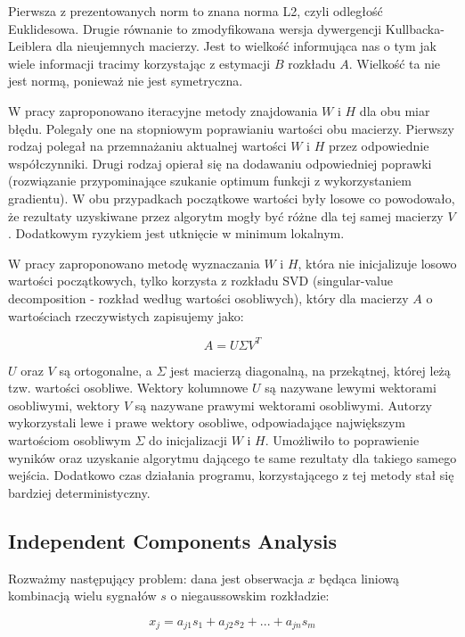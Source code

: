 \documentclass[oneside, eng]{mgr}
\begin{document}
Pierwsza z prezentowanych norm to znana norma L2, czyli odległość Euklidesowa. Drugie równanie to zmodyfikowana wersja dywergencji Kullbacka-Leiblera dla nieujemnych macierzy. Jest to wielkość informująca nas o tym jak wiele informacji tracimy korzystając z estymacji $B$ rozkładu $A$. Wielkość ta nie jest normą, ponieważ nie jest symetryczna.

W pracy \cite{NMF} zaproponowano iteracyjne metody znajdowania $W$ i $H$ dla obu miar błędu. Polegały one na stopniowym poprawianiu wartości obu macierzy. Pierwszy rodzaj polegał na przemnażaniu aktualnej wartości $W$ i $H$ przez odpowiednie współczynniki. Drugi rodzaj opierał się na dodawaniu odpowiedniej poprawki (rozwiązanie przypominające szukanie optimum funkcji z wykorzystaniem gradientu). W obu przypadkach początkowe wartości były losowe co powodowało, że rezultaty uzyskiwane przez algorytm mogły być różne dla tej samej macierzy $V$. Dodatkowym ryzykiem jest utknięcie w minimum lokalnym.

W pracy \cite{NMF_SVD} zaproponowano metodę wyznaczania $W$ i $H$, która nie inicjalizuje losowo wartości początkowych, tylko korzysta z rozkładu SVD (singular-value decomposition - rozkład według wartości osobliwych), który dla macierzy $A$ o wartościach rzeczywistych zapisujemy jako:

\begin{equation}
	A = U \Sigma V^T
\end{equation}

$U$ oraz $V$ są ortogonalne, a $\Sigma$ jest macierzą diagonalną, na przekątnej, której leżą tzw. wartości osobliwe. Wektory kolumnowe $U$ są nazywane lewymi wektorami osobliwymi, wektory $V$ są nazywane prawymi wektorami osobliwymi. Autorzy \cite{NMF_SVD} wykorzystali lewe i prawe wektory osobliwe, odpowiadające największym wartościom osobliwym $\Sigma$ do inicjalizacji $W$ i $H$. Umożliwiło to poprawienie wyników oraz uzyskanie algorytmu dającego te same rezultaty dla takiego samego wejścia. Dodatkowo czas działania programu, korzystającego z tej metody stał się bardziej deterministyczny.

\subsection{Independent Components Analysis}

Rozważmy następujący problem: dana jest obserwacja $x$ będąca liniową kombinacją wielu sygnałów $s$ o niegaussowskim rozkładzie:

\begin{equation}
	x_j = a_{j1} s_1 + a_{j2} s_2 + ... + a_{jn} s_m
\end{equation}
\end{document}
